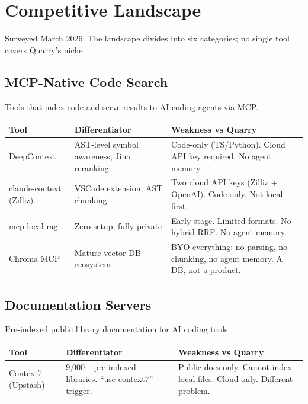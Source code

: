 \documentclass[11pt,letterpaper]{article}
\begin{document}

\newpage
\section*{Competitive Landscape}

Surveyed March 2026. The landscape divides into six categories; no single tool
covers Quarry's niche.

\subsection*{MCP-Native Code Search}

Tools that index code and serve results to AI coding agents via MCP.

\begin{tabularx}{\textwidth}{@{} l X X @{}}
\toprule
\textbf{Tool} & \textbf{Differentiator} & \textbf{Weakness vs Quarry} \\
\midrule
DeepContext & AST-level symbol awareness, Jina reranking & Code-only (TS/Python). Cloud API key required. No agent memory. \\
claude-context (Zilliz) & VSCode extension, AST chunking & Two cloud API keys (Zilliz + OpenAI). Code-only. Not local-first. \\
mcp-local-rag & Zero setup, fully private & Early-stage. Limited formats. No hybrid RRF. No agent memory. \\
Chroma MCP & Mature vector DB ecosystem & BYO everything: no parsing, no chunking, no agent memory. A DB, not a product. \\
\bottomrule
\end{tabularx}

\subsection*{Documentation Servers}

Pre-indexed public library documentation for AI coding tools.

\begin{tabularx}{\textwidth}{@{} l X X @{}}
\toprule
\textbf{Tool} & \textbf{Differentiator} & \textbf{Weakness vs Quarry} \\
\midrule
Context7 (Upstash) & 9{,}000+ pre-indexed libraries. ``use context7'' trigger. & Public docs only. Cannot index local files. Cloud-only. Different problem. \\
\bottomrule
\end{tabularx}
\end{document}
